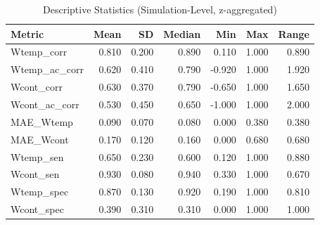 \begin{table}[ht]
\centering
\begin{tabular}{lrrrrrr}
  \hline
Metric & Mean & SD & Median & Min & Max & Range \\ 
  \hline
Wtemp\_corr & 0.810 & 0.200 & 0.890 & 0.110 & 1.000 & 0.890 \\ 
  Wtemp\_ac\_corr & 0.620 & 0.410 & 0.790 & -0.920 & 1.000 & 1.920 \\ 
  Wcont\_corr & 0.630 & 0.370 & 0.790 & -0.650 & 1.000 & 1.650 \\ 
  Wcont\_ac\_corr & 0.530 & 0.450 & 0.650 & -1.000 & 1.000 & 2.000 \\ 
  MAE\_Wtemp & 0.090 & 0.070 & 0.080 & 0.000 & 0.380 & 0.380 \\ 
  MAE\_Wcont & 0.170 & 0.120 & 0.160 & 0.000 & 0.680 & 0.680 \\ 
  Wtemp\_sen & 0.650 & 0.230 & 0.600 & 0.120 & 1.000 & 0.880 \\ 
  Wcont\_sen & 0.930 & 0.080 & 0.940 & 0.330 & 1.000 & 0.670 \\ 
  Wtemp\_spec & 0.870 & 0.130 & 0.920 & 0.190 & 1.000 & 0.810 \\ 
  Wcont\_spec & 0.390 & 0.310 & 0.310 & 0.000 & 1.000 & 1.000 \\ 
   \hline
\end{tabular}
\caption{Descriptive Statistics (Simulation-Level, z-aggregated)} 
\end{table}
